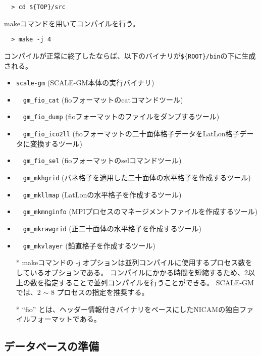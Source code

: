 \begin{verbatim}
  > cd ${TOP}/src
\end{verbatim}

\noindent makeコマンドを用いてコンパイルを行う。
\begin{verbatim}
  > make -j 4
\end{verbatim}
コンパイルが正常に終了したならば、以下のバイナリが\verb|${ROOT}/bin|の下に生成される。
 \begin{itemize}
   \item \verb|scale-gm| (SCALE-GM本体の実行バイナリ)
   \item　\verb|gm_fio_cat| (fioフォーマットのcatコマンドツール)
   \item　\verb|gm_fio_dump| (fioフォーマットのファイルをダンプするツール)
   \item　\verb|gm_fio_ico2ll| (fioフォーマットの二十面体格子データをLatLon格子データに変換するツール)
   \item　\verb|gm_fio_sel| (fioフォーマットのselコマンドツール)
   \item　\verb|gm_mkhgrid| (バネ格子を適用した二十面体の水平格子を作成するツール)
   \item　\verb|gm_mkllmap| (LatLonの水平格子を作成するツール)
   \item　\verb|gm_mkmnginfo| (MPIプロセスのマネージメントファイルを作成するツール)
   \item　\verb|gm_mkrawgrid| (正二十面体の水平格子を作成するツール)
   \item　\verb|gm_mkvlayer| (鉛直格子を作成するツール)
 \end{itemize}

\begin{itemize}
  \item[*] makeコマンドの -j オプションは並列コンパイルに使用するプロセス数をしているオプションである。
   コンパイルにかかる時間を短縮するため、2以上の数を指定することで並列コンパイルを行うことができる。
   SCALE-GMでは、2 $\sim$ 8 プロセスの指定を推奨する。
  \item[*] ``fio'' とは、ヘッダー情報付きバイナリをベースにしたNICAMの独自ファイルフォーマットである。
\end{itemize}


\subsection{データベースの準備}

